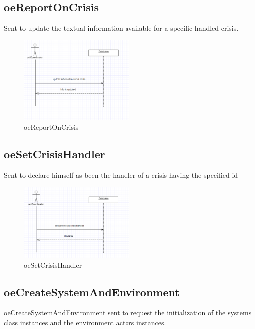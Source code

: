 \subsection{oeReportOnCrisis}
Sent to update the textual information available for a specific handled crisis.

\begin{figure}[H]
\begin{center}
\includegraphics[width=0.5\textwidth]{./images/oeReportOnCrisis.eps} 
\end{center}
\caption{oeReportOnCrisis}
\end{figure}

\subsection{oeSetCrisisHandler}
Sent to declare himself as been the handler of a crisis having the specified id

\begin{figure}[H]
\begin{center}
\includegraphics[width=0.5\textwidth]{./images/oeSetCrisisHandler.eps} 
\end{center}
\caption{oeSetCrisisHandler}
\end{figure}

\subsection{oeCreateSystemAndEnvironment}
oeCreateSystemAndEnvironment sent to request the initialization of the systems
class instances and the environment actors instances.


